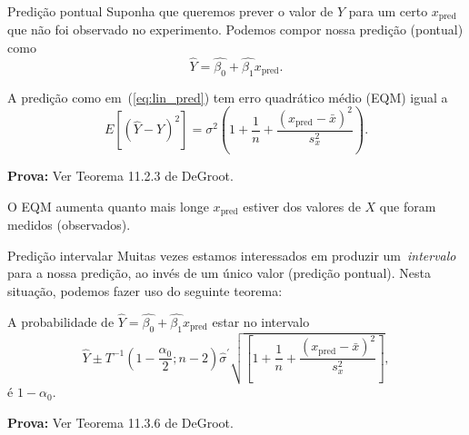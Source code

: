 \begin{frame}{Predição pontual}
Suponha que queremos prever o valor de $Y$ para um certo $x_{\text{pred}}$ que não foi observado no experimento.
Podemos compor nossa predição (pontual) como 
\begin{equation}
 \label{eq:lin_pred}
\hat{Y} = \hat{\beta_0} + \hat{\beta_1}x_{\text{pred}}. 
\end{equation}

\begin{theo}
\label{thm:MSE_linreg_pred}
 A predição como em~(\ref{eq:lin_pred}) tem erro quadrático médio (EQM) igual a
 \[ E\left[\left(\hat{Y} - Y\right)^2\right] = \sigma^2 \left(1 + \frac{1}{n} + \frac{\left(x_{\text{pred}}-\bar{x}\right)^2}{s_x^2}\right). \] 
\end{theo}
\textbf{Prova:} Ver Teorema 11.2.3 de DeGroot.

\begin{obs}
 O EQM aumenta quanto mais longe $x_{\text{pred}}$ estiver dos valores de $X$ que foram medidos (observados).
\end{obs}
\end{frame}

\begin{frame}{Predição intervalar}
Muitas vezes estamos interessados em produzir um~\textit{intervalo} para a nossa predição, ao invés de um único valor (predição pontual). 
Nesta situação, podemos fazer uso do seguinte teorema:
\begin{theo}
\label{thm:CI_pred_mean}
A probabilidade de $\hat{Y} = \hat{\beta_0} + \hat{\beta_1}x_{\text{pred}}$ estar no intervalo
\begin{equation*}
 \hat{Y} \pm T^{-1}\left(1-\frac{\alpha_0}{2}; n-2\right)\hat{\sigma}^\prime \sqrt{\left[ 1+ \frac{1}{n} + \frac{\left(x_{\text{pred}}-\bar{x}\right)^2}{s_x^2} \right]},
\end{equation*}
é $1-\alpha_0$.
\end{theo}
\textbf{Prova:} Ver Teorema 11.3.6 de DeGroot.
\end{frame}

